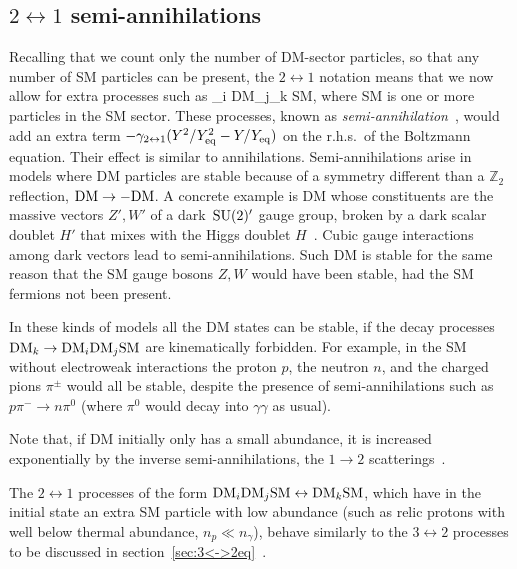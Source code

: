 \subsection{$2\leftrightarrow 1$ semi-annihilations}
Recalling that we count only the number of DM-sector particles, so that 
any number of SM particles can be present,
the $2\leftrightarrow 1$ notation  means that we now allow for extra processes such as
_i {\rm DM}_j_k {\rm SM},\eeq 
where SM is one or more particles in the SM sector.
These processes, known as {\em semi-annihilation}~\cite{semiann}, would add
an extra term $-\gamma_{2\leftrightarrow 1}   (Y^2/Y^{2}_{\rm eq}-Y/Y_{\rm eq})$
on the r.h.s.~of the Boltzmann equation.
Their effect is similar to annihilations.
Semi-annihilations arise in models where DM particles are stable because of a symmetry 
different than a $\mathbb{Z}_2$ reflection, ${\rm DM}\to - {\rm DM}$.
A concrete example is DM whose constituents are the  massive vectors $Z', W'$ of a dark
$\,{\rm SU}(2)'$ gauge group, broken by a dark scalar doublet $H'$ that mixes with the Higgs doublet $H$~\cite{semiann}.
Cubic gauge interactions among dark vectors lead to semi-annihilations.
Such DM is stable for the same reason that the SM gauge bosons $Z,W$ would have been stable, had the SM fermions not been present.

\smallskip

In these kinds of models all the DM states can be stable, if the decay processes ${\rm DM}_k \to {\rm DM}_i {\rm DM}_j {\rm SM}$ are kinematically forbidden.
For example, in the SM without electroweak interactions the proton $p$, the neutron $n$, and the charged pions $\pi^\pm$ would all be stable, despite the presence of semi-annihilations such as $p\pi^-\to n \pi^0$ 
(where $\pi^0$ would decay into $\gamma\gamma$ as usual).

Note that, if DM initially only has a small abundance, it is increased exponentially by the inverse semi-annihilations, the $1\to 2$ scatterings~\cite{semiann}.

The $2\leftrightarrow 1$ processes of the form ${\rm DM}_i {\rm DM}_j {\rm SM} \leftrightarrow {\rm DM}_k {\rm SM}$, which have in the initial state an extra SM particle with low abundance (such as relic protons with well below thermal abundance, $n_p\ll n_\gamma$),
 behave similarly to the $3\leftrightarrow 2$ processes 
to be discussed in section~\ref{sec:3<->2eq}~\cite{CoSIMP}.



